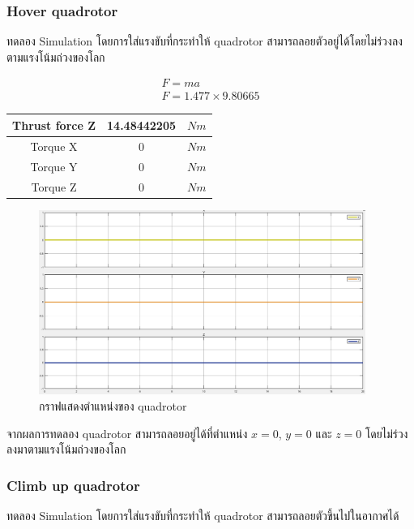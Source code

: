\subsubsection{Hover quadrotor}
ทดลอง Simulation โดยการใส่แรงขับที่กระทำให้ quadrotor สามารถลอยตัวอยู่ได้โดยไม่ร่วงลงตามแรงโน้มถ่วงของโลก

\begin{equation}
    \begin{array}{c}
    {F = ma}\\
    {F = 1.477 \times 9.80665}
    \label{equ:newton_law}
    \end{array}
\end{equation}
\begin{center}
    \begin{tabular}{ | c | c | c | } 
    \hline
    Thrust force Z & 14.48442205 & $Nm$ \\ 
    \hline
    Torque X & 0 & $Nm$ \\ 
    \hline
    Torque Y & 0 & $Nm$ \\ 
    \hline
    Torque Z & 0 & $Nm$ \\ 
    \hline
    \end{tabular}
\end{center}
\begin{figure}[!ht]
	\centering
	\includegraphics[width=0.95\textwidth]{images/simulink/test_hover.png}
	\caption{กราฟแสดงตำแหน่งของ quadrotor}
\end{figure}

จากผลการทดลอง quadrotor สามารถลอยอยู่ได้ที่ตำแหน่ง $x=0$, $y=0$ และ $z=0$ โดยไม่ร่วงลงมาตามแรงโน้มถ่วงของโลก

\clearpage
\subsubsection{Climb up quadrotor}
ทดลอง Simulation โดยการใส่แรงขับที่กระทำให้ quadrotor สามารถลอยตัวขึ้นไปในอากาศได้

